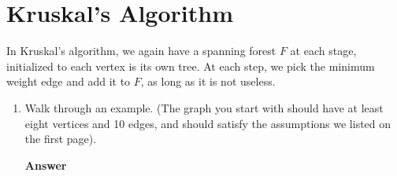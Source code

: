 \documentclass{article}
\begin{document}
\section*{Kruskal's Algorithm}

In Kruskal's algorithm, we again have a spanning forest $F$ at each stage,
initialized to each vertex is its own tree. At each step, we pick the minimum
weight edge and add it to $F$, as long as it is not useless.

\begin{enumerate}

    \item Walk through an example.
        (The graph you start with should have at least eight vertices
        and 10 edges, and should satisfy the assumptions we listed on the
        first page).

        \textbf{Answer}
        \vspace{3in}

\end{enumerate}
\end{document}
